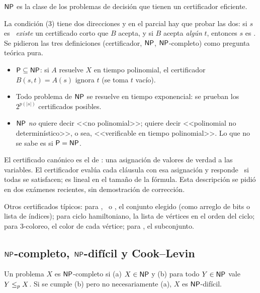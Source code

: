 \begin{definicion}
$\mathsf{NP}$ es la clase de los problemas de decisión que tienen un certificador eficiente.
\end{definicion}

La condición (3) tiene dos direcciones y en el parcial hay que probar las dos: si $s$ es \npsi\ \emph{existe} un certificado corto que $B$ acepta, y si $B$ acepta \emph{algún} $t$, entonces $s$ es \npsi. Se pidieron las tres definiciones (certificador, $\mathsf{NP}$, $\mathsf{NP}$-completo) como pregunta teórica pura.

\begin{itemize}
  \item $\mathsf{P}\subseteq\mathsf{NP}$: si $A$ resuelve $X$ en tiempo polinomial, el certificador $B(s,t)=A(s)$ ignora $t$ (se toma $t$ vacío).
  \item Todo problema de $\mathsf{NP}$ se resuelve en tiempo exponencial: se prueban los $2^{p(|s|)}$ certificados posibles.
  \item $\mathsf{NP}$ \emph{no} quiere decir <<no polinomial>>; quiere decir <<polinomial no determinístico>>, o sea, <<verificable en tiempo polinomial>>. Lo que no se sabe es si $\mathsf{P}=\mathsf{NP}$.
\end{itemize}

El certificado canónico es el de \npSAT: una asignación de valores de verdad a las variables. El certificador evalúa cada cláusula con esa asignación y responde \npsi\ si todas se satisfacen; es lineal en el tamaño de la fórmula. Esta descripción se pidió en dos exámenes recientes, sin demostración de corrección.

Otros certificados típicos: para \npIS, \npVC\ o \npSC, el conjunto elegido (como arreglo de bits o lista de índices); para ciclo hamiltoniano, la lista de vértices en el orden del ciclo; para 3-coloreo, el color de cada vértice; para \npSS, el subconjunto.

\subsection{\texorpdfstring{$\mathsf{NP}$}{NP}-completo, \texorpdfstring{$\mathsf{NP}$}{NP}-difícil y Cook--Levin}

\begin{definicion}
Un problema $X$ es $\mathsf{NP}$-completo si (a) $X\in\mathsf{NP}$ y (b) para todo $Y\in\mathsf{NP}$ vale $Y\le_{p} X$. Si se cumple (b) pero no necesariamente (a), $X$ es $\mathsf{NP}$-difícil.
\end{definicion}

